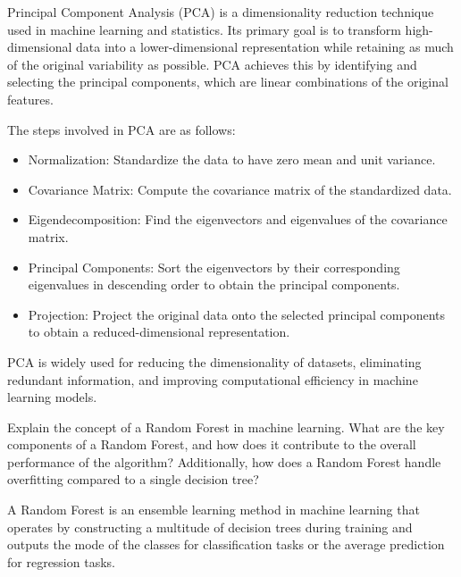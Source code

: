 \documentclass[a4paper,11pt,addpoints]{exam}
\begin{document}
\begin{questions}
    \begin{solution}[5in]
        Principal Component Analysis (PCA) is a dimensionality reduction technique used in machine learning and statistics. Its primary goal is to transform high-dimensional data into a lower-dimensional representation while retaining as much of the original variability as possible. PCA achieves this by identifying and selecting the principal components, which are linear combinations of the original features.

        The steps involved in PCA are as follows:
        \begin{itemize}
        \item Normalization: Standardize the data to have zero mean and unit variance.
        \item Covariance Matrix: Compute the covariance matrix of the standardized data.
        \item Eigendecomposition: Find the eigenvectors and eigenvalues of the covariance matrix.
        \item Principal Components: Sort the eigenvectors by their corresponding eigenvalues in descending order to obtain the principal components.
        \item Projection: Project the original data onto the selected principal components to obtain a reduced-dimensional representation.
        \end{itemize}
        PCA is widely used for reducing the dimensionality of datasets, eliminating redundant information, and improving computational efficiency in machine learning models.
    \end{solution}

    \question[10]
    Explain the concept of a Random Forest in machine learning. What are the key components of a Random Forest, and how does it contribute to the overall performance of the algorithm? Additionally, how does a Random Forest handle overfitting compared to a single decision tree?

    \begin{solution}[5in]
    A Random Forest is an ensemble learning method in machine learning that operates by constructing a multitude of decision trees during training and outputs the mode of the classes for classification tasks or the average prediction for regression tasks.


\end{solution}
\end{questions}
\end{document}
